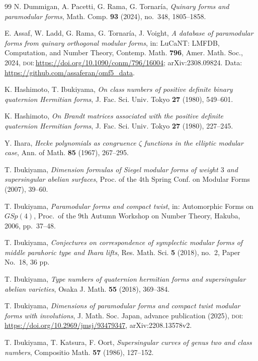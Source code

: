 \documentclass[11pt]{amsart}
\providecommand{\doi}[1]{\textsc{doi:}\,\url{https://doi.org/#1}}
\theoremstyle{plain}
\theoremstyle{definition}
\begin{document}
\begin{thebibliography}{99}
		 N. Dummigan, A. Pacetti, G. Rama, G. Tornar\'ia,
		\emph{Quinary forms and paramodular forms}, Math. Comp. \textbf{93} (2024),
		no.~348, 1805--1858.
		
		 E. Assaf, W. Ladd, G. Rama, G. Tornar\'ia, J. Voight,
		\emph{A database of paramodular forms from quinary orthogonal modular
			forms}, in: LuCaNT: LMFDB, Computation, and Number Theory, Contemp.
		Math. \textbf{796}, Amer. Math. Soc., 2024, \doi{10.1090/conm/796/16004};
		arXiv:2308.09824. Data: \url{https://github.com/assaferan/omf5_data}.
		
		 K. Hashimoto, T. Ibukiyama, \emph{On class numbers
			of positive definite binary quaternion Hermitian forms}, J. Fac. Sci. Univ.
		Tokyo \textbf{27} (1980), 549--601.
		
		 K. Hashimoto, \emph{On Brandt matrices associated with
			the positive definite quaternion Hermitian forms}, J. Fac. Sci. Univ. Tokyo \textbf{27}
		(1980), 227--245.
		
		 Y. Ihara, \emph{Hecke polynomials as congruence $\zeta$
			functions in the elliptic modular case}, Ann. of Math. \textbf{85} (1967), 267--295.
		
		 T. Ibukiyama, \emph{Dimension formulas of Siegel
			modular forms of weight $3$ and supersingular abelian surfaces}, Proc. of the
		4th Spring Conf. on Modular Forms (2007), 39--60.
		
		 T. Ibukiyama, \emph{Paramodular forms and
			compact twist}, in: Automorphic Forms on $GSp(4)$, Proc.\ of the 9th Autumn
		Workshop on Number Theory, Hakuba, 2006, pp.~37--48.
		
		 T. Ibukiyama, \emph{Conjectures on correspondence of
			symplectic modular forms of middle parahoric type and Ihara lifts}, Res. Math.
		Sci. \textbf{5} (2018), no.~2, Paper No.~18, 36 pp.
		
		 T. Ibukiyama, \emph{Type numbers of quaternion
			hermitian forms and supersingular abelian varieties}, Osaka J. Math. \textbf{55}
		(2018), 369--384.
		
		 T. Ibukiyama, \emph{Dimensions of paramodular forms and
			compact twist modular forms with involutions}, J. Math. Soc. Japan, advance
		publication (2025), \doi{10.2969/jmsj/93479347}, arXiv:2208.13578v2.
		
		 T. Ibukiyama, T. Katsura, F. Oort, \emph{Supersingular curves
			of genus two and class numbers}, Compositio Math. \textbf{57} (1986), 127--152.
		

\end{thebibliography}
\end{document}
